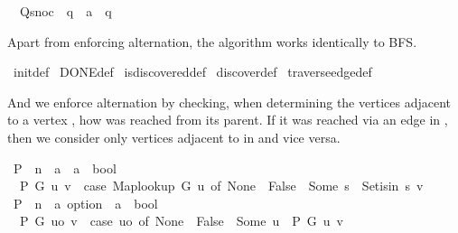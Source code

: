 \begin{isabellebody}
\ \ Q{\isacharunderscore}{\kern0pt}snoc\ {\isacharcolon}{\kern0pt}{\isacharcolon}{\kern0pt}\ {\isachardoublequoteopen}{\isacharprime}{\kern0pt}q\ {\isasymRightarrow}\ {\isacharprime}{\kern0pt}a\ {\isasymRightarrow}\ {\isacharprime}{\kern0pt}q{\isachardoublequoteclose}\isanewline
{}%
\begin{isamarkuptext}%
Apart from enforcing alternation, the algorithm works identically to BFS.%
\end{isamarkuptext}\isamarkuptrue%
\isamarkupfalse%
\ init{\isacharunderscore}{\kern0pt}def\isanewline
\isanewline
{}\isamarkupfalse%
\ DONE{\isacharunderscore}{\kern0pt}def\isanewline
\isanewline
{}\isamarkupfalse%
\ is{\isacharunderscore}{\kern0pt}discovered{\isacharunderscore}{\kern0pt}def\isanewline
\isanewline
{}\isamarkupfalse%
\ discover{\isacharunderscore}{\kern0pt}def\isanewline
\isanewline
{}\isamarkupfalse%
\ traverse{\isacharunderscore}{\kern0pt}edge{\isacharunderscore}{\kern0pt}def%
\begin{isamarkuptext}%
And we enforce alternation by checking, when determining the vertices adjacent to a vertex
, how  was reached from its parent. If it was reached via an edge in ,
then we consider only vertices adjacent to  in  and vice versa.%
\end{isamarkuptext}\isamarkuptrue%
\isamarkupfalse%
\ P\ {\isacharcolon}{\kern0pt}{\isacharcolon}{\kern0pt}\ {\isachardoublequoteopen}{\isacharprime}{\kern0pt}n\ {\isasymRightarrow}\ {\isacharprime}{\kern0pt}a\ {\isasymRightarrow}\ {\isacharprime}{\kern0pt}a\ {\isasymRightarrow}\ bool{\isachardoublequoteclose}\ \isanewline
\ \ {\isachardoublequoteopen}P\ G\ u\ v\ {\isasymequiv}\ case\ Map{\isacharunderscore}{\kern0pt}lookup\ G\ u\ of\ None\ {\isasymRightarrow}\ False\ {\isacharbar}{\kern0pt}\ Some\ s\ {\isasymRightarrow}\ Set{\isacharunderscore}{\kern0pt}isin\ s\ v{\isachardoublequoteclose}\isanewline
\isanewline
{}\isamarkupfalse%
\ P{\isacharprime}{\kern0pt}\ {\isacharcolon}{\kern0pt}{\isacharcolon}{\kern0pt}\ {\isachardoublequoteopen}{\isacharprime}{\kern0pt}n\ {\isasymRightarrow}\ {\isacharprime}{\kern0pt}a\ option\ {\isasymRightarrow}\ {\isacharprime}{\kern0pt}a\ {\isasymRightarrow}\ bool{\isachardoublequoteclose}\ \isanewline
\ \ {\isachardoublequoteopen}P{\isacharprime}{\kern0pt}\ G\ uo\ v\ {\isasymequiv}\ case\ uo\ of\ None\ {\isasymRightarrow}\ False\ {\isacharbar}{\kern0pt}\ Some\ u\ {\isasymRightarrow}\ P\ G\ u\ v{\isachardoublequoteclose}\isanewline

\end{isabellebody}
